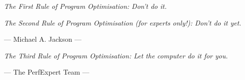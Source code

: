 \documentclass[11pt,a4paper,oneside]{book}
\begin{document}
\pagestyle{empty}



\glsaddall
\printglossaries

\cleardoublepage
{}
\printindex

\tableofcontents



\emph{The First Rule of Program Optimisation: Don't do it.}

\emph{The Second Rule of Program Optimisation (for experts only!): Don't do it yet.}

  ---  Michael A. Jackson ---

\emph{The Third Rule of Program Optimisation: Let the computer do it for you.}

--- The PerfExpert Team ---






\appendix


\end{document}
